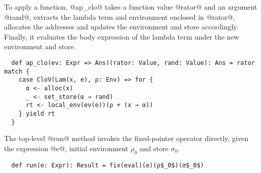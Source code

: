 To apply a function, @ap_clo@ takes a function value @rator@ and an argument
@rand@, extracts the lambda term and environment enclosed in @rator@, allocates
the addresses and updates the environment and store accordingly. Finally, it
evaluates the body expression of the lambda term under the new environment and
store.
\begin{lstlisting}
  def ap_clo(ev: Expr => Ans)(rator: Value, rand: Value): Ans = rator match {
    case CloV(Lam(x, e), ρ: Env) => for {
      α <- alloc(x)
      _ <- set_store(α → rand)
      rt <- local_env(ev(e))(ρ + (x → α))
    } yield rt
  }
\end{lstlisting}

The top-level @run@ method invokes the fixed-pointer operator directly,
given the expression @e@, initial environment $\rho_0$ and store $\sigma_0$.
\begin{lstlisting}
  def run(e: Expr): Result = fix(eval)(e)(ρ$_0$)(σ$_0$)
\end{lstlisting}
